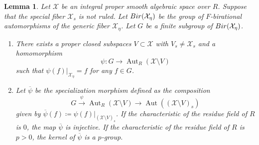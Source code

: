 \documentclass[11pt,reqno,oneside]{amsart}
\numberwithin{equation}{section}
\newtheorem{lemma}[theorem]{Lemma}
\theoremstyle{definition}
\DeclareMathOperator{\Aut}{Aut}
\newcommand{\Bir}{{\rm Bir}}
\begin{document}
\begin{lemma}
\label{Lemma:Specialization}
Let $\mathcal{X}$
be an integral proper smooth algebraic space over $R$.
Suppose that the special fiber $\mathcal{X}_{s}$ is not ruled.
Let $\Bir(\mathcal{X}_{\eta})$ be the group of $F$-birational automorphisms
of the generic fiber $\mathcal{X}_{\eta}$.
Let $G$ be a finite subgroup of $\Bir(\mathcal{X}_{\eta})$.
\begin{enumerate}
\item There exists a proper closed subspaces $V \subset \mathcal{X}$
with $V_s \neq \mathcal{X}_{s}$ and a homomorphism
\[
\psi \colon G \to \Aut_R(\mathcal{X} \setminus V)
\]
such that $\psi(f)|_{\mathcal{X}_{\eta}} = f$ for any $f\in G$.

\item Let $\overline{\psi}$ be the specialization morphism defined as the composition 
\[
G \overset{\psi}{\to} \Aut_R(\mathcal{X} \setminus V)
 \to \Aut((\mathcal{X} \setminus V)_{s})
\]
given by $\overline{\psi}(f) \coloneqq \psi(f)|_{(\mathcal{X} \setminus V)_{s}}$.
If the characteristic of the residue field of $R$ is $0$,
the map $\overline{\psi}$ is injective.
If the characteristic of the residue field of $R$ is $p > 0$,
the kernel of $\overline{\psi}$ is a $p$-group.
\end{enumerate}
\end{lemma}
\end{document}
